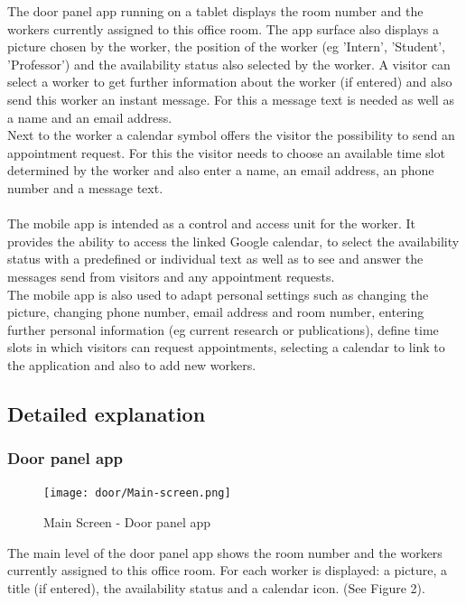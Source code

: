 \documentclass[article,colorback,accentcolor=tud4c, 11pt]{tudreport}
\begin{document}
The door panel app running on a tablet displays the room number and the workers currently assigned to this office room. The app surface also displays a picture chosen by the worker, the position of the worker (eg 'Intern', 'Student', 'Professor') and the availability status also selected by the worker.
A visitor can select a worker to get further information about the worker (if entered) and also send this worker an instant message. For this a message text is needed as well as a name and an email address.\\

Next to the worker a calendar symbol offers the visitor the possibility to send an appointment request. For this the visitor needs to choose an available time slot determined by the worker and also enter a name, an email address, an phone number and a message text.\\ \\

The mobile app is intended as a control and access unit for the worker. It provides the ability to access the linked Google calendar, to select the availability status with a predefined or individual text as well as to see and answer the messages send from visitors and any appointment requests.\\

The mobile app is also used to adapt personal settings such as changing the picture, changing phone number, email address and room number, entering further personal information (eg current research or publications), define time slots in which visitors can request appointments, selecting a calendar to link to the application and also to add new workers.
	
\subsection{Detailed explanation}

\subsubsection{Door panel app}

	\begin{figure}
		\centering
		\texttt{[image: door/Main-screen.png]}
		\caption{Main Screen - Door panel app}
	\end{figure}
	
The main level of the door panel app shows the room number and the workers currently assigned to this office room. For each worker is displayed: a picture, a title (if entered), the availability status and a calendar icon. (See Figure 2).\\
\end{document}
